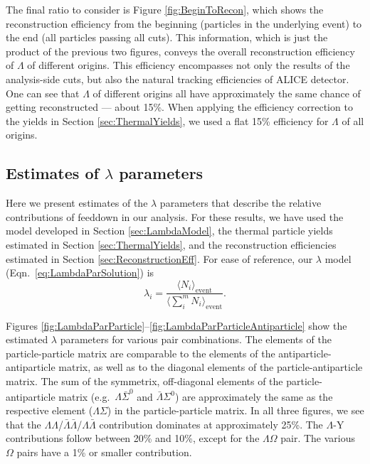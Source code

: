 The final ratio to consider is Figure \ref{fig:BeginToRecon}, which shows the reconstruction efficiency from the beginning (particles in the underlying event) to the end (all particles passing all cuts).
This information, which is just the product of the previous two figures, conveys the overall reconstruction efficiency of $\Lambda$ of different origins.
This efficiency encompasses not only the results of the analysis-side cuts, but also the natural tracking efficiencies of ALICE detector.  
One can see that $\Lambda$ of different origins all have approximately the same chance of getting reconstructed --- about 15\%.
When applying the efficiency correction to the yields in Section \ref{sec:ThermalYields}, we used a flat 15\% efficiency for $\Lambda$ of all origins.

\subsection{Estimates of \texorpdfstring{$\lambda$}{lambda} parameters}
\label{sec:LambdaParamEstimates}

Here we present estimates of the $\lambda$ parameters that describe the relative contributions of feeddown in our analysis.
For these results, we have used the model developed in Section \ref{sec:LambdaModel}, the thermal particle yields estimated in Section \ref{sec:ThermalYields}, and the reconstruction efficiencies estimated in Section \ref{sec:ReconstructionEff}.
For ease of reference, our $\lambda$ model (Eqn.\ \ref{eq:LambdaParSolution}) is
$$\lambda_i = \frac{\langle N_{i}\rangle_{\mathrm{event}}} {\langle\sum_i^m N_{i}\rangle_{\mathrm{event}}}.$$

Figures \ref{fig:LambdaParParticle}--\ref{fig:LambdaParParticleAntiparticle} show the estimated $\lambda$ parameters for various pair combinations. 
The elements of the particle-particle matrix are comparable to the elements of the antiparticle-antiparticle matrix, as well as to the diagonal elements of the particle-antiparticle matrix.
The sum of the symmetrix, off-diagonal elements of the particle-antiparticle matrix (e.g.\ $\Lambda\bar{\Sigma}^0$ and $\bar{\Lambda}\Sigma^0$) are approximately the same as the respective element ($\Lambda\Sigma$) in the particle-particle matrix.
In all three figures, we see that the $\Lambda\Lambda$/$\bar{\Lambda}\bar{\Lambda}$/$\Lambda\bar{\Lambda}$ contribution dominates at approximately 25\%. The $\Lambda$-Y contributions follow between 20\% and 10\%, except for the $\Lambda\Omega$ pair. The various $\Omega$ pairs have a 1\% or smaller contribution. 

